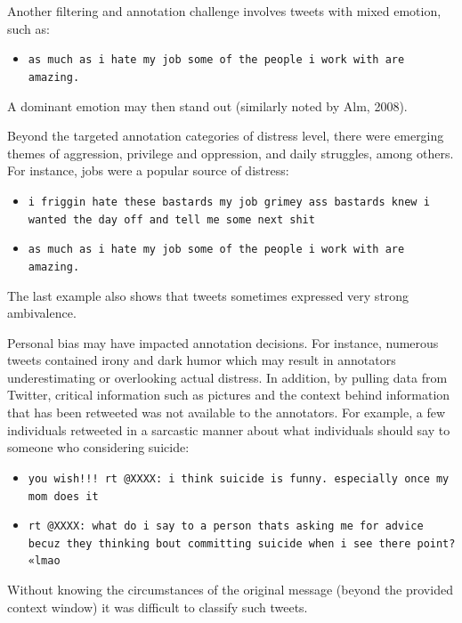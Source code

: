 \documentclass[11pt]{article}
\begin{document}
Another filtering and annotation challenge involves tweets with mixed emotion, such as:

\begin{itemize}
\footnotesize
\item \texttt{as much as i hate my job some of the people i work with are amazing.}
\end{itemize}


A dominant emotion may then stand out (similarly noted by Alm, 2008).

Beyond the targeted annotation categories of distress level, there were emerging themes of aggression, privilege and oppression, and daily struggles, among others.  For instance, jobs were a popular source of distress:

\begin{itemize}
\footnotesize
\item \texttt{i friggin hate these bastards \@ my job grimey ass bastards knew i wanted the day off and tell me some next shit}
\item \texttt{as much as i hate my job some of the people i work with are amazing.}
\end{itemize}

The last example also shows that tweets sometimes expressed very strong ambivalence.

Personal bias may have impacted annotation decisions. For instance, numerous tweets contained irony and dark humor which may result in annotators underestimating or overlooking actual distress. In addition, by pulling data from Twitter, critical information such as pictures and the context behind information that has been retweeted was not available to the annotators.  For example, a few individuals retweeted in a sarcastic manner about what individuals should say to someone who considering suicide:

\begin{itemize}
\footnotesize
\item \texttt{you wish!!! rt @XXXX: i think suicide is funny. especially once my mom does it}
\item \texttt{rt @XXXX: what do i say to a person thats asking me for advice becuz they thinking bout committing suicide when i see there point? «lmao}
\end{itemize}
Without knowing the circumstances of the original message (beyond the provided context window) it was difficult to classify such tweets.  %
\end{document}
